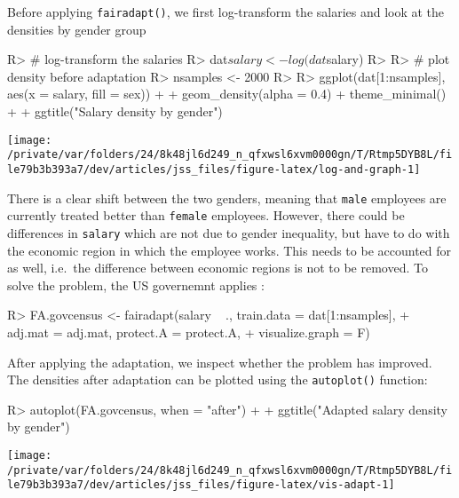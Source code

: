 \documentclass[
  notitle]{jss}
\begin{document}
Before applying \texttt{fairadapt()}, we first log-transform the
salaries and look at the densities by gender group

\begin{CodeChunk}
\begin{CodeInput}
R> # log-transform the salaries
R> dat$salary <- log(dat$salary)
R> 
R> # plot density before adaptation
R> nsamples <- 2000
R> 
R> ggplot(dat[1:nsamples], aes(x = salary, fill = sex)) +
+   geom_density(alpha = 0.4)  + theme_minimal() +
+   ggtitle("Salary density by gender")
\end{CodeInput}


\begin{center}\texttt{[image: /private/var/folders/24/8k48jl6d249\_n\_qfxwsl6xvm0000gn/T/Rtmp5DYB8L/file79b3b393a7/dev/articles/jss\_files/figure-latex/log-and-graph-1]} \end{center}

\end{CodeChunk}

There is a clear shift between the two genders, meaning that
\texttt{male} employees are currently treated better than
\texttt{female} employees. However, there could be differences in
\texttt{salary} which are not due to gender inequality, but have to do
with the economic region in which the employee works. This needs to be
accounted for as well, i.e.~the difference between economic regions is
not to be removed. To solve the problem, the US governemnt applies
:

\begin{CodeChunk}
\begin{CodeInput}
R> FA.govcensus <- fairadapt(salary ~ ., train.data = dat[1:nsamples],
+                           adj.mat = adj.mat, protect.A = protect.A,
+                           visualize.graph = F)
\end{CodeInput}
\end{CodeChunk}

After applying the adaptation, we inspect whether the problem has
improved. The densities after adaptation can be plotted using the
\texttt{autoplot()} function:

\begin{CodeChunk}
\begin{CodeInput}
R> autoplot(FA.govcensus, when = "after") +
+   ggtitle("Adapted salary density by gender")
\end{CodeInput}


\begin{center}\texttt{[image: /private/var/folders/24/8k48jl6d249\_n\_qfxwsl6xvm0000gn/T/Rtmp5DYB8L/file79b3b393a7/dev/articles/jss\_files/figure-latex/vis-adapt-1]} \end{center}

\end{CodeChunk}
\end{document}

